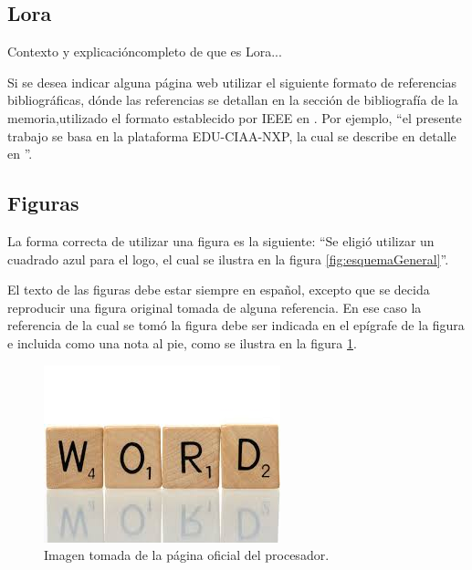 \subsection{Lora}
Contexto y explicacióncompleto de que es Lora...


Si se desea indicar alguna página web utilizar el siguiente formato de referencias bibliográficas, dónde las referencias se detallan en la sección de bibliografía de la memoria,utilizado el formato establecido por IEEE en \citep{IEEE:citation}. Por ejemplo, ``el presente trabajo se basa en la plataforma EDU-CIAA-NXP, la cual se describe en detalle en \citep{CIAA}''.

\subsection{Figuras} 

La forma correcta de utilizar una figura es la siguiente: ``Se eligió utilizar un cuadrado azul para el logo, el cual se ilustra en la figura \ref{fig:esquemaGeneral}''.


El texto de las figuras debe estar siempre en español, excepto que se decida reproducir una figura original tomada de alguna referencia. En ese caso la referencia de la cual se tomó la figura debe ser indicada en el epígrafe de la figura e incluida como una nota al pie, como se ilustra en la figura \ref{fig:palabraIngles}.

\begin{figure}[h!]
	\centering
	\includegraphics[scale=.25]{./Figures/word.jpeg}
	\caption{Imagen tomada de la página oficial del procesador\protect\footnotemark.}
	\label{fig:palabraIngles}
\end{figure}

